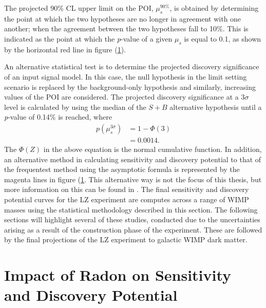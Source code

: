 {\begin{figure}[H!]
    \label{fig:plr_hypothesis_distributions}
\end{figure}
%

The projected 90\% CL upper limit on the POI, $\mu_{s}^{90\%}$, is obtained by determining the point at which the two hypotheses are no longer in agreement with one another; when the agreement between the two hypotheses fall to 10\%. This is indicated as the point at which the \textit{p}-value of a given $\mu_{s}$ is equal to 0.1, as shown by the horizontal red line in figure (\ref{fig:plr_hypothesis_distributions}). 

An alternative statistical test is to determine the projected discovery significance of an input signal model. In this case, the null hypothesis in the limit setting scenario is replaced by the background-only hypothesis and similarly, increasing values of the POI are considered. The projected discovery significance at a $3\sigma$ level is calculated by using the median of the $S+B$ alternative hypothesis until a \textit{p}-value of 0.14\% is reached, where
%
\begin{equation}
    \begin{split}
    p(\mu_{s}^{3\sigma}) &= 1 - \Phi(3) \\
    &= 0.0014. 
    \end{split}
    \label{eq:full_lz_likelihood}
\end{equation}
%
The $\Phi(Z)$ in the above equation is the normal cumulative function. In addition, an alternative method in calculating sensitivity and discovery potential to that of the frequentest method using the asymptotic formula is represented by the magenta lines in figure (\ref{fig:plr_hypothesis_distributions}. This alternative way is not the focus of this thesis, but more information on this can be found in \cite{ibles}. The final sensitivity and discovery potential curves for the LZ experiment are computes across a range of WIMP masses using the statistical methodology described in this section. The following sections will highlight several of these studies, conducted due to the uncertainties arising as a result of the construction phase of the experiment. These are followed by the final projections of the LZ experiment to galactic WIMP dark matter.


\section{Impact of Radon on Sensitivity and Discovery Potential}
\label{sec:radon_impact}

}

